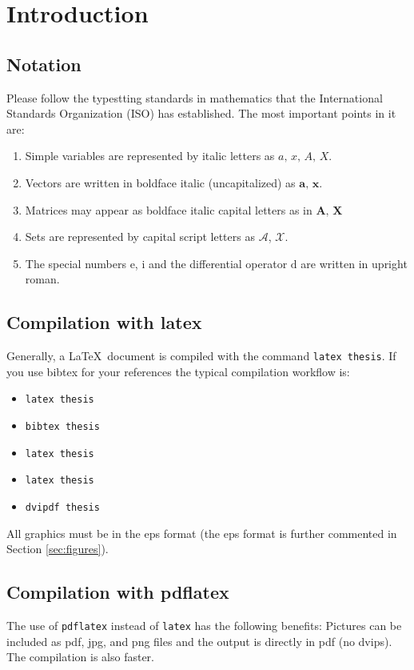 \chapter{Introduction}
\label{ch:introduction}

\section{Notation}
\label{sec:notation}
Please follow the typestting standards in mathematics that the International
Standards Organization (ISO) has established. The most important points in it are: 
  

\begin{enumerate}
\item Simple variables are represented by italic letters as $a,\,x,\,A,\,X$.
\item Vectors are written in boldface italic (uncapitalized) as $\boldsymbol{a,\, x}$.
\item Matrices may appear as boldface italic capital letters as in $\boldsymbol{A,\, X}$
\item Sets are represented by capital script letters as $\mathcal{A}$, $\mathcal{X}$.
\item The special numbers $\mathrm{e}$, $\mathrm{i}$ and the differential operator $\mathrm{d}$ are written in upright roman.
\end{enumerate}
%
%
%
\section{Compilation with latex}
Generally, a \LaTeX\ document is compiled with the command \verb'latex thesis'.
If you use bibtex for your references the typical compilation workflow is: 
\begin{itemize}
	\item \verb'latex thesis'
	\item \verb'bibtex thesis'
	\item \verb'latex thesis'
	\item \verb'latex thesis'
	\item \verb'dvipdf thesis'
\end{itemize}
All graphics must be in the eps format (the eps format is further commented in Section \ref{sec:figures}).

\section{Compilation with pdflatex}
The use of \verb'pdflatex' instead of \verb'latex' has the following benefits:
Pictures can be included as pdf, jpg, and png files 
and the output is directly in pdf (no dvips). The compilation is also faster. 

